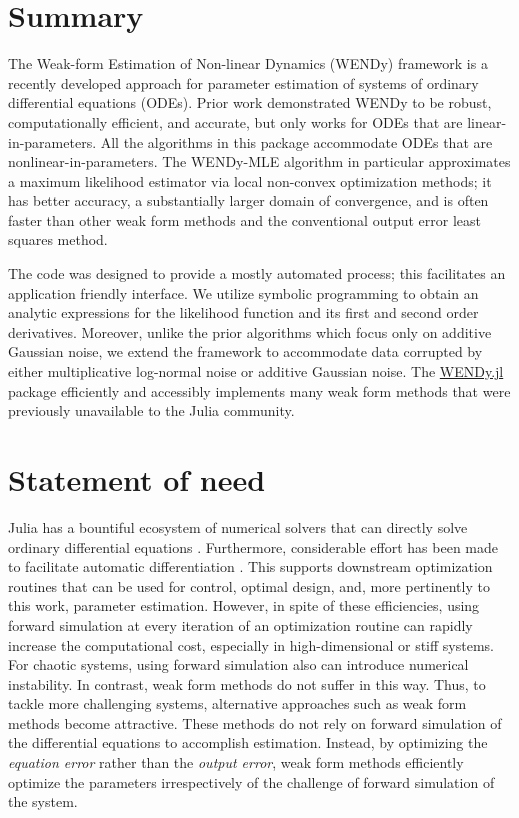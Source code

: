 \documentclass{juliacon}
\begin{document}


\maketitle

\section{Summary}

The Weak-form Estimation of Non-linear Dynamics (WENDy) framework is a recently developed approach for parameter estimation of systems of ordinary differential equations (ODEs). Prior work demonstrated WENDy to be robust, computationally efficient, and accurate, but only works for ODEs that are linear-in-parameters. All the algorithms in this package accommodate ODEs that are nonlinear-in-parameters. The WENDy-MLE algorithm in particular approximates a maximum likelihood estimator via local non-convex optimization methods; it has better accuracy, a substantially larger domain of convergence, and is often faster than other weak form methods and the conventional output error least squares method. 

The code was designed to provide a mostly automated process; this facilitates an application friendly interface. We utilize symbolic programming to obtain an analytic expressions for the likelihood function and its first and second order derivatives. Moreover, unlike the prior algorithms which focus only on additive Gaussian noise, we extend the framework to accommodate  data corrupted by either multiplicative log-normal noise or additive Gaussian noise. The \href{https://github.com/nrummel/WENDy.jl}{WENDy.jl} package efficiently and accessibly implements many weak form methods that were previously unavailable to the Julia community. 

\section{Statement of need}
Julia has a bountiful ecosystem of numerical solvers that can directly solve ordinary differential equations \citep{BezansonEdelmanKarpinskiEtAl2017SIAMRev,RackauckasNie2017JORS}. Furthermore, considerable effort has been made to facilitate automatic differentiation \citep{RevelsLubinPapamarkou2016arXiv160707892}. This supports downstream optimization routines that can be used for control, optimal design, and, more pertinently to this work, parameter estimation. However, in spite of these efficiencies, using forward simulation at every iteration of an optimization routine can rapidly increase the computational cost, especially in high-dimensional or stiff systems. For chaotic systems, using forward simulation also can introduce numerical instability. In contrast, weak form methods do not suffer in this way. Thus, to tackle more challenging systems, alternative approaches such as weak form methods become attractive. These methods do not rely on forward simulation of the differential equations to accomplish estimation. Instead, by optimizing the \emph{equation error} rather than the \emph{output error}, weak form methods efficiently optimize the parameters irrespectively of the challenge of forward simulation of the system.
\end{document}
